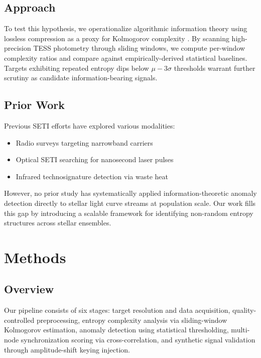 \documentclass[twocolumn,10pt]{article}
\begin{document}
\subsection{Approach}

To test this hypothesis, we operationalize algorithmic information theory using lossless compression as a proxy for Kolmogorov complexity \citep{li1997}. By scanning high-precision TESS photometry through sliding windows, we compute per-window complexity ratios and compare against empirically-derived statistical baselines. Targets exhibiting repeated entropy dips below $\mu-3\sigma$ thresholds warrant further scrutiny as candidate information-bearing signals.

\subsection{Prior Work}

Previous SETI efforts have explored various modalities:
\begin{itemize}
    \item Radio surveys targeting narrowband carriers \citep{cocconi1960}
    \item Optical SETI searching for nanosecond laser pulses \citep{howard2016}
    \item Infrared technosignature detection via waste heat \citep{wright2015}
\end{itemize}

However, no prior study has systematically applied information-theoretic anomaly detection directly to stellar light curve streams at population scale. Our work fills this gap by introducing a scalable framework for identifying non-random entropy structures across stellar ensembles.

\section{Methods}

\subsection{Overview}

Our pipeline consists of six stages: target resolution and data acquisition, quality-controlled preprocessing, entropy complexity analysis via sliding-window Kolmogorov estimation, anomaly detection using statistical thresholding, multi-node synchronization scoring via cross-correlation, and synthetic signal validation through amplitude-shift keying injection.
\end{document}
